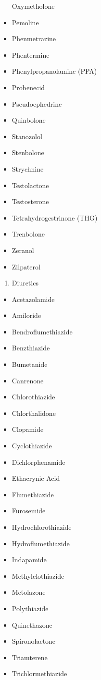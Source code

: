 \documentclass[
]{book}
\providecommand{\tightlist}{%
  \setlength{\itemsep}{0pt}\setlength{\parskip}{0pt}}
\begin{document}
\begin{itemize}
  Oxymetholone
\item
  Pemoline
\item
  Phenmetrazine
\item
  Phentermine
\item
  Phenylpropanolamine (PPA)
\item
  Probenecid
\item
  Pseudoephedrine
\item
  Quinbolone
\item
  Stanozolol
\item
  Stenbolone
\item
  Strychnine
\item
  Testolactone
\item
  Testosterone
\item
  Tetrahydrogestrinone (THG)
\item
  Trenbolone
\item
  Zeranol
\item
  Zilpaterol
\end{itemize}

\begin{enumerate}
\def\labelenumi{(\alph{enumi})}
\setcounter{enumi}{3}
\tightlist
\item
  Diuretics
\end{enumerate}

\begin{itemize}
\tightlist
\item
  Acetazolamide
\item
  Amiloride
\item
  Bendroflumethiazide
\item
  Benzthiazide
\item
  Bumetanide
\item
  Canrenone
\item
  Chlorothiazide
\item
  Chlorthalidone
\item
  Clopamide
\item
  Cyclothiazide
\item
  Dichlorphenamide
\item
  Ethacrynic Acid
\item
  Flumethiazide
\item
  Furosemide
\item
  Hydrochlorothiazide
\item
  Hydroflumethiazide
\item
  Indapamide
\item
  Methylclothiazide
\item
  Metolazone
\item
  Polythiazide
\item
  Quinethazone
\item
  Spironolactone
\item
  Triamterene
\item
  Trichlormethiazide
\end{itemize}
\end{document}
